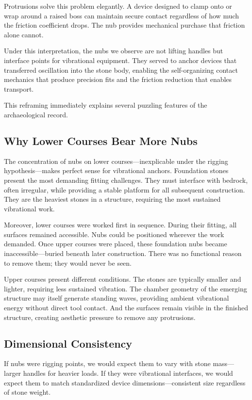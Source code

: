 \documentclass[11pt]{article}
\begin{document}
Protrusions solve this problem elegantly. A device designed to clamp onto or wrap around a raised boss can maintain secure contact regardless of how much the friction coefficient drops. The nub provides mechanical purchase that friction alone cannot.

Under this interpretation, the nubs we observe are not lifting handles but interface points for vibrational equipment. They served to anchor devices that transferred oscillation into the stone body, enabling the self-organizing contact mechanics that produce precision fits and the friction reduction that enables transport.

This reframing immediately explains several puzzling features of the archaeological record.

\subsection{Why Lower Courses Bear More Nubs}

The concentration of nubs on lower courses—inexplicable under the rigging hypothesis—makes perfect sense for vibrational anchors. Foundation stones present the most demanding fitting challenges. They must interface with bedrock, often irregular, while providing a stable platform for all subsequent construction. They are the heaviest stones in a structure, requiring the most sustained vibrational work.

Moreover, lower courses were worked first in sequence. During their fitting, all surfaces remained accessible. Nubs could be positioned wherever the work demanded. Once upper courses were placed, these foundation nubs became inaccessible—buried beneath later construction. There was no functional reason to remove them; they would never be seen.

Upper courses present different conditions. The stones are typically smaller and lighter, requiring less sustained vibration. The chamber geometry of the emerging structure may itself generate standing waves, providing ambient vibrational energy without direct tool contact. And the surfaces remain visible in the finished structure, creating aesthetic pressure to remove any protrusions.

\subsection{Dimensional Consistency}

If nubs were rigging points, we would expect them to vary with stone mass—larger handles for heavier loads. If they were vibrational interfaces, we would expect them to match standardized device dimensions—consistent size regardless of stone weight.
\end{document}
